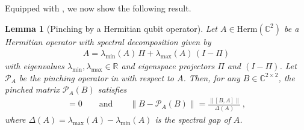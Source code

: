 \documentclass[11pt]{article}
\theoremstyle{plain}
\newtheorem{lemma}[theorem]{Lemma}
\begin{document}
Equipped with , we now show the following result.

\begin{lemma}[Pinching by a Hermitian qubit operator]\label{thm:pinch}
Let $A \in \mathrm{Herm}(\mathbb{C}^{2})$ be a Hermitian operator with spectral decomposition given by
\begin{align}
A = \lambda_{\min}(A)\,\Pi + \lambda_{\max}(A)\,(I-\Pi)
\end{align}
with eigenvalues $\lambda_{\min},\lambda_{\max} \in \mathbb{R}$ and eigenspace projectors $\Pi$ and $(I-\Pi)$. Let $\mathcal{P}_A$ be the pinching operator in  with respect to $A$.
Then, for any $B \in \mathbb{C}^{2 \times 2}$, the pinched matrix $\mathcal{P}_A(B)$ satisfies
\begin{align}
[\mathcal{P}_A(B), A] = 0
\qquad \text{and} \qquad
\|B - \mathcal{P}_A(B)\|
= \frac{\|[B,A]\|}{\Delta(A)} \,,
\end{align}
where $\Delta(A) = \lambda_{\max}(A) - \lambda_{\min}(A)$ is the spectral gap of $A$.
\end{lemma}
\end{document}
